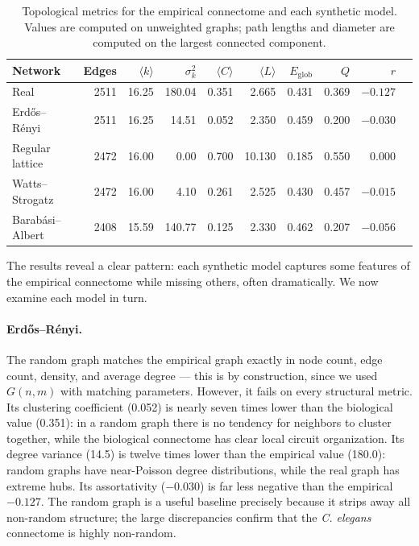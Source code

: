 \documentclass[12pt,a4paper]{report}
\begin{document}
\begin{table}[H]
\centering
\caption{Topological metrics for the empirical connectome and each synthetic model. Values are computed on unweighted graphs; path lengths and diameter are computed on the largest connected component.}
\label{tab:metric-comparison}
\small
\begin{tabular}{lrrrrrrrrr}
\toprule
Network & Edges & $\langle k \rangle$ & $\sigma^2_k$ & $\langle C \rangle$ & $\langle L \rangle$ & $E_{\text{glob}}$ & $Q$ & $r$ \\
\midrule
Real & 2511 & 16.25 & 180.04 & 0.351 & 2.665 & 0.431 & 0.369 & $-0.127$ \\
Erd\H{o}s--R\'{e}nyi & 2511 & 16.25 & 14.51 & 0.052 & 2.350 & 0.459 & 0.200 & $-0.030$ \\
Regular lattice & 2472 & 16.00 & 0.00 & 0.700 & 10.130 & 0.185 & 0.550 & $ 0.000$ \\
Watts--Strogatz & 2472 & 16.00 & 4.10 & 0.261 & 2.525 & 0.430 & 0.457 & $-0.015$ \\
Barab\'{a}si--Albert & 2408 & 15.59 & 140.77 & 0.125 & 2.330 & 0.462 & 0.207 & $-0.056$ \\
\bottomrule
\end{tabular}
\end{table}

The results reveal a clear pattern: each synthetic model captures some features of the empirical connectome while missing others, often dramatically. We now examine each model in turn.

\paragraph{Erd\H{o}s--R\'{e}nyi.} The random graph matches the empirical graph exactly in node count, edge count, density, and average degree — this is by construction, since we used $G(n, m)$ with matching parameters. However, it fails on every structural metric. Its clustering coefficient (0.052) is nearly seven times lower than the biological value (0.351): in a random graph there is no tendency for neighbors to cluster together, while the biological connectome has clear local circuit organization. Its degree variance (14.5) is twelve times lower than the empirical value (180.0): random graphs have near-Poisson degree distributions, while the real graph has extreme hubs. Its assortativity ($-0.030$) is far less negative than the empirical $-0.127$. The random graph is a useful baseline precisely because it strips away all non-random structure; the large discrepancies confirm that the \textit{C. elegans} connectome is highly non-random.
\end{document}
